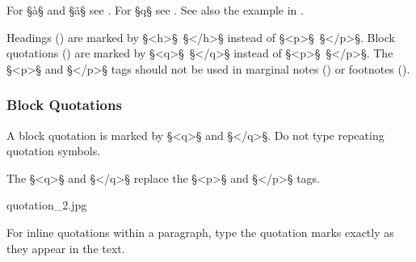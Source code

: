 \begin{crossref}
For  §à§ and §ã§ see . For  §\´q§ see . See also the example in .
\end{crossref}

\begin{note}
Headings () are marked by §<h>§~§</h>§ instead of §<p>§~§</p>§. Block quotations  () are marked by §<q>§~§</q>§ instead of §<p>§~§</p>§. The §<p>§ and §</p>§ tags should not be used in marginal notes () or footnotes ().
\end{note}


\subsubsection{Block Quotations}
\label{section block quotations}

\begin{mainrule}
A block quotation is marked by §<q>§ and §</q>§. Do not type repeating quotation symbols.
\end{mainrule}

\begin{clarification}
The §<q>§ and §</q>§ replace the §<p>§ and §</p>§ tags.
\end{clarification}

\begin{sampleImage}{quotation_2.jpg}
\end{sampleImage}

\begin{note}
For inline quotations within a paragraph, type the quotation marks exactly as they appear in the text.
\end{note}


